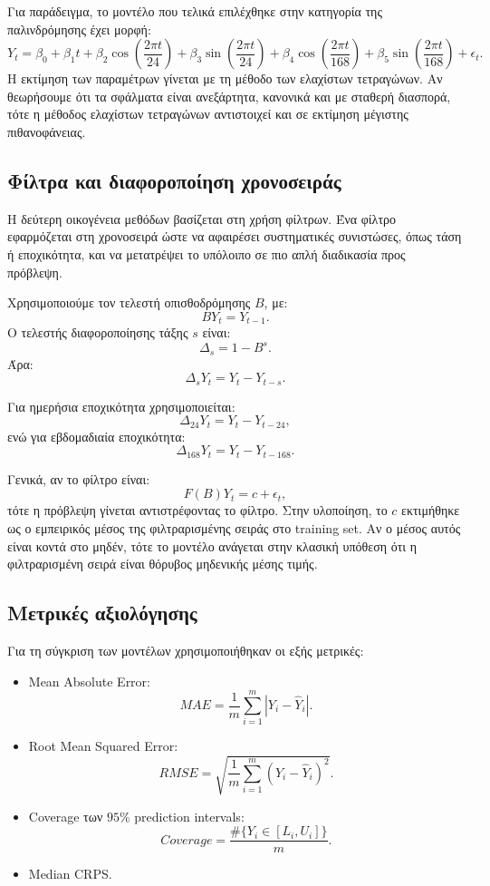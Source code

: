 \documentclass{article}
\begin{document}
Για παράδειγμα, το μοντέλο που τελικά επιλέχθηκε στην κατηγορία της παλινδρόμησης έχει μορφή:
\[
Y_t = \beta_0 + \beta_1 t
+ \beta_2 \cos\left(\frac{2\pi t}{24}\right)
+ \beta_3 \sin\left(\frac{2\pi t}{24}\right)
+ \beta_4 \cos\left(\frac{2\pi t}{168}\right)
+ \beta_5 \sin\left(\frac{2\pi t}{168}\right)
+ \epsilon_t.
\]
Η εκτίμηση των παραμέτρων γίνεται με τη μέθοδο των ελαχίστων τετραγώνων. Αν θεωρήσουμε ότι τα σφάλματα είναι ανεξάρτητα, κανονικά και με σταθερή διασπορά, τότε η μέθοδος ελαχίστων τετραγώνων αντιστοιχεί και σε εκτίμηση μέγιστης πιθανοφάνειας.

\subsection{Φίλτρα και διαφοροποίηση χρονοσειράς}

Η δεύτερη οικογένεια μεθόδων βασίζεται στη χρήση φίλτρων. Ένα φίλτρο εφαρμόζεται στη χρονοσειρά ώστε να αφαιρέσει συστηματικές συνιστώσες, όπως τάση ή εποχικότητα, και να μετατρέψει το υπόλοιπο σε πιο απλή διαδικασία προς πρόβλεψη.

Χρησιμοποιούμε τον τελεστή οπισθοδρόμησης $B$, με:
\[
BY_t = Y_{t-1}.
\]
Ο τελεστής διαφοροποίησης τάξης $s$ είναι:
\[
\Delta_s = 1 - B^s.
\]
Άρα:
\[
\Delta_s Y_t = Y_t - Y_{t-s}.
\]

Για ημερήσια εποχικότητα χρησιμοποιείται:
\[
\Delta_{24}Y_t = Y_t - Y_{t-24},
\]
ενώ για εβδομαδιαία εποχικότητα:
\[
\Delta_{168}Y_t = Y_t - Y_{t-168}.
\]

Γενικά, αν το φίλτρο είναι:
\[
F(B)Y_t = c + \epsilon_t,
\]
τότε η πρόβλεψη γίνεται αντιστρέφοντας το φίλτρο. Στην υλοποίηση, το $c$ εκτιμήθηκε ως ο εμπειρικός μέσος της φιλτραρισμένης σειράς στο training set. Αν ο μέσος αυτός είναι κοντά στο μηδέν, τότε το μοντέλο ανάγεται στην κλασική υπόθεση ότι η φιλτραρισμένη σειρά είναι θόρυβος μηδενικής μέσης τιμής.

\subsection{Μετρικές αξιολόγησης}

Για τη σύγκριση των μοντέλων χρησιμοποιήθηκαν οι εξής μετρικές:

\begin{itemize}
    \item Mean Absolute Error:
    \[
    MAE = \frac{1}{m}\sum_{i=1}^{m}|Y_i-\hat{Y}_i|.
    \]
    \item Root Mean Squared Error:
    \[
    RMSE = \sqrt{\frac{1}{m}\sum_{i=1}^{m}(Y_i-\hat{Y}_i)^2}.
    \]
    \item Coverage των $95\%$ prediction intervals:
    \[
    Coverage = \frac{\#\{Y_i \in [L_i,U_i]\}}{m}.
    \]
    \item Median CRPS.
\end{itemize}
\end{document}
